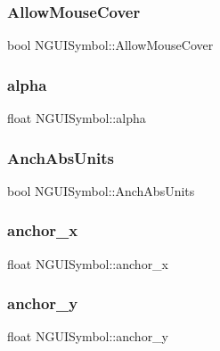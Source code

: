 \subsubsection{\texorpdfstring{Allow\+Mouse\+Cover}{AllowMouseCover}}
{\footnotesize\ttfamily bool N\+G\+U\+I\+Symbol\+::\+Allow\+Mouse\+Cover}

\hypertarget{class_n_g_u_i_symbol_aaa99ad7dea080f2ba1ac563dee5329bb}{}\label{class_n_g_u_i_symbol_aaa99ad7dea080f2ba1ac563dee5329bb} 
\subsubsection{\texorpdfstring{alpha}{alpha}}
{\footnotesize\ttfamily float N\+G\+U\+I\+Symbol\+::alpha}

\hypertarget{class_n_g_u_i_symbol_a6b21b7f98a37efcf18e8e5486a4d9186}{}\label{class_n_g_u_i_symbol_a6b21b7f98a37efcf18e8e5486a4d9186} 
\subsubsection{\texorpdfstring{Anch\+Abs\+Units}{AnchAbsUnits}}
{\footnotesize\ttfamily bool N\+G\+U\+I\+Symbol\+::\+Anch\+Abs\+Units}

\hypertarget{class_n_g_u_i_symbol_ae4f8f21764404090bf7fbe8679b14109}{}\label{class_n_g_u_i_symbol_ae4f8f21764404090bf7fbe8679b14109} 
\subsubsection{\texorpdfstring{anchor\+\_\+x}{anchor\_x}}
{\footnotesize\ttfamily float N\+G\+U\+I\+Symbol\+::anchor\+\_\+x}

\hypertarget{class_n_g_u_i_symbol_a266afe7f41114c844c46a916840f7876}{}\label{class_n_g_u_i_symbol_a266afe7f41114c844c46a916840f7876} 
\subsubsection{\texorpdfstring{anchor\+\_\+y}{anchor\_y}}
{\footnotesize\ttfamily float N\+G\+U\+I\+Symbol\+::anchor\+\_\+y}

